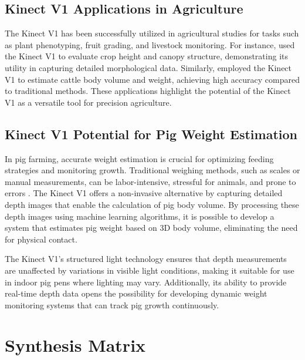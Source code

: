 {\subsection{Kinect V1 Applications in Agriculture}

The Kinect V1 has been successfully utilized in agricultural studies for tasks such as plant phenotyping, fruit grading, and livestock monitoring. For instance, \citep{Andujar2016} used the Kinect V1 to evaluate crop height and canopy structure, demonstrating its utility in capturing detailed morphological data. Similarly, \citep{pezzuolo2018barn} employed the Kinect V1 to estimate cattle body volume and weight, achieving high accuracy compared to traditional methods. These applications highlight the potential of the Kinect V1 as a versatile tool for precision agriculture.

\subsection{Kinect V1 Potential for Pig Weight Estimation}

In pig farming, accurate weight estimation is crucial for optimizing feeding strategies and monitoring growth. Traditional weighing methods, such as scales or manual measurements, can be labor-intensive, stressful for animals, and prone to errors \citep{faucitano2018transport}. The Kinect V1 offers a non-invasive alternative by capturing detailed depth images that enable the calculation of pig body volume. By processing these depth images using machine learning algorithms, it is possible to develop a system that estimates pig weight based on 3D body volume, eliminating the need for physical contact.

The Kinect V1's structured light technology ensures that depth measurements are unaffected by variations in visible light conditions, making it suitable for use in indoor pig pens where lighting may vary. Additionally, its ability to provide real-time depth data opens the possibility for developing dynamic weight monitoring systems that can track pig growth continuously.


\section{Synthesis Matrix}

}
